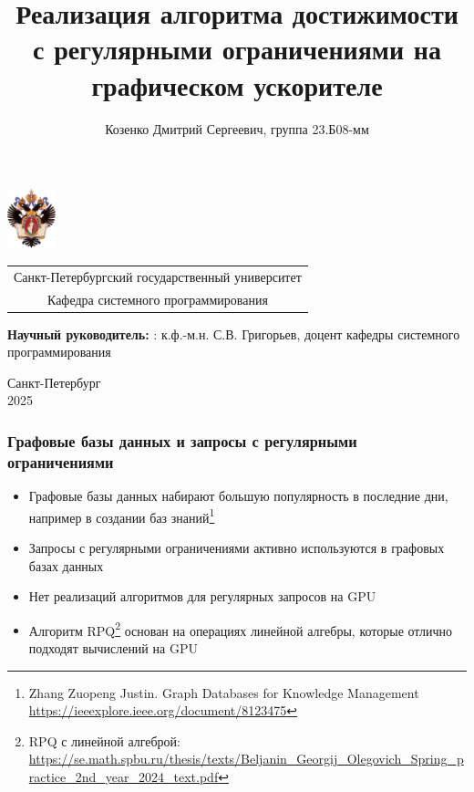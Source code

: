 \documentclass{beamer}
\title[Реализация RPQ на видеокарте]
{Реализация алгоритма достижимости с регулярными ограничениями на
графическом ускорителе}
\institute[СПбГУ]{}
\author[Дмитрий Козенко]{Козенко Дмитрий Сергеевич, группа 23.Б08-мм}
\begin{document}
{
\begin{frame}
  \includegraphics[width=1.4cm]{pictures/SPbGU_Logo.png}
\vspace{-35pt}
\hspace{-10pt}
\begin{center}
   \begin{tabular}{c}
        \scriptsize{Санкт-Петербургский государственный университет} \\
        \scriptsize{Кафедра системного программирования}
    \end{tabular}
\titlepage
\end{center}

\btVFill

{\scriptsize
   \textbf{Научный руководитель:} : к.ф.-м.н. С.В. Григорьев, доцент кафедры системного программирования
 }
\begin{center}
  \vspace{5pt}
  \scriptsize{Санкт-Петербург\\2025}
  \end{center}
\end{frame}
}

\begin{frame}[fragile]  
  \frametitle{Графовые базы данных и запросы с регулярными ограничениями}
  \begin{itemize}
    \item Графовые базы данных набирают большую популярность в последние дни, например в создании баз знаний\footnote{Zhang Zuopeng Justin. Graph Databases for Knowledge Management \url{https://ieeexplore.ieee.org/document/8123475}}
    \item Запросы с регулярными ограничениями активно используются в графовых базах данных
    \item Нет реализаций алгоритмов для регулярных запросов на GPU
    \item Алгоритм RPQ\footnote{RPQ с линейной алгеброй: \url{https://se.math.spbu.ru/thesis/texts/Beljanin_Georgij_Olegovich_Spring_practice_2nd_year_2024_text.pdf}} основан на операциях линейной алгебры, которые отлично подходят вычислений на GPU
  \end{itemize}
\end{frame}
\end{document}
